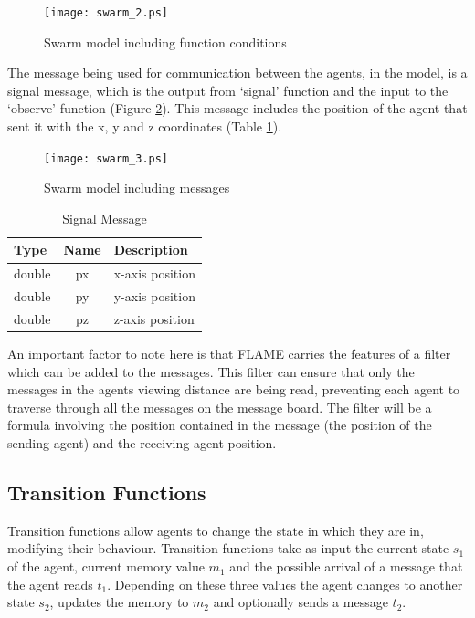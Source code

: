 \documentclass[a4paper,11pt]{article}
\begin{document}
\begin{figure}[ht]
\begin{center}
\texttt{[image: swarm\_2.ps]}
\caption{Swarm model including function conditions}
\label{fig:swarm_2}
\end{center}
\end{figure}

The message being used for communication between the agents, in the
model, is a signal message, which is the output from `signal'
function and the input to the `observe' function (Figure
\ref{fig:swarm_3}). This message includes the position of the agent
that sent it with the x, y and z coordinates (Table
\ref{tab:signal_message}).


\begin{figure}[ht]
\begin{center}
\texttt{[image: swarm\_3.ps]}
\caption{Swarm model including messages} \label{fig:swarm_3}
\end{center}
\end{figure}



\begin{table}[ht]
\centering
\begin{tabular}{|l||c||l|}
\hline
Type&Name&Description\\
\hline \hline
double&px&x-axis position\\
\hline
double&py&y-axis position\\
\hline
double&pz&z-axis position\\
\hline
\end{tabular}
\caption{Signal Message} \label{tab:signal_message}
\end{table}


An important factor to note here is that FLAME carries the features
of a filter which can be added to the messages. This filter can
ensure that only the messages in the agents viewing distance are
being read, preventing each agent to traverse through all the
messages on the message board. The filter will be a formula
involving the position contained in the message (the position of the
sending agent) and the receiving agent position.


\subsection{Transition Functions}
 Transition functions allow agents to change the state in
 which they are in, modifying their behaviour. Transition functions take as input the current state $s_{1}$ of the agent, current memory value
 $m_{1}$ and the possible arrival of a message that the agent reads  $t_{1}$. Depending on these three values the agent changes to another state $s_{2}$, updates the memory to $m_{2}$ and
 optionally sends a message $t_{2}$.
\end{document}

